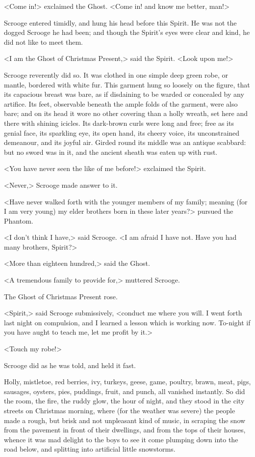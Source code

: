 <Come in!> exclaimed the Ghost. <Come in! and know me better, man!>

Scrooge entered timidly, and hung his head before this Spirit. He was not the
dogged Scrooge he had been; and though the Spirit's eyes were clear and kind, he
did not like to meet them.

<I am the Ghost of Christmas Present,> said the Spirit. <Look upon me!>

Scrooge reverently did so. It was clothed in one simple deep green robe, or
mantle, bordered with white fur. This garment hung so loosely on the figure,
that its capacious breast was bare, as if disdaining to be warded or concealed
by any artifice. Its feet, observable beneath the ample folds of the garment,
were also bare; and on its head it wore no other covering than a holly wreath,
set here and there with shining icicles. Its dark-brown curls were long and
free; free as its genial face, its sparkling eye, its open hand, its cheery
voice, its unconstrained demeanour, and its joyful air. Girded round its middle
was an antique scabbard: but no sword was in it, and the ancient sheath was
eaten up with rust.

<You have never seen the like of me before!> exclaimed the Spirit.

<Never,> Scrooge made answer to it.

<Have never walked forth with the younger members of my family; meaning (for I
am very young) my elder brothers born in these later years?> pursued the
Phantom.

<I don't think I have,> said Scrooge. <I am afraid I have not. Have you had many
brothers, Spirit?>

<More than eighteen hundred,> said the Ghost.

<A tremendous family to provide for,> muttered Scrooge.

The Ghost of Christmas Present rose.

<Spirit,> said Scrooge submissively, <conduct me where you will. I went forth
last night on compulsion, and I learned a lesson which is working now. To-night
if you have aught to teach me, let me profit by it.>

<Touch my robe!>

Scrooge did as he was told, and held it fast.

Holly, mistletoe, red berries, ivy, turkeys, geese, game, poultry, brawn, meat,
pigs, sausages, oysters, pies, puddings, fruit, and punch, all vanished
instantly. So did the room, the fire, the ruddy glow, the hour of night, and
they stood in the city streets on Christmas morning, where (for the weather was
severe) the people made a rough, but brisk and not unpleasant kind of music, in
scraping the snow from the pavement in front of their dwellings, and from the
tops of their houses, whence it was mad delight to the boys to see it come
plumping down into the road below, and splitting into artificial little
snowstorms.

